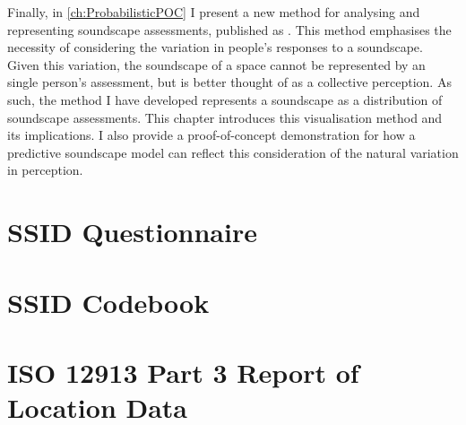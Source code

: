 \documentclass[twoside,fontsize=12pt,titlepage,chapterprefix=true
]{scrbook}
\begin{document}
Finally, in \cref{ch:ProbabilisticPOC} I present a new method for analysing and representing soundscape assessments, published as \citet{Mitchell2022How}. This method emphasises the necessity of considering the variation in people's responses to a soundscape. Given this variation, the soundscape of a space cannot be represented by an single person's assessment, but is better thought of as a collective perception. As such, the method I have developed represents a soundscape as a distribution of soundscape assessments. This chapter introduces this visualisation method and its implications. I also provide a proof-of-concept demonstration for how a predictive soundscape model can reflect this consideration of the natural variation in perception.  











\printglossaries



 \appendix


 \chapter{SSID Questionnaire}\label{app:questionnaire}
 

\chapter{SSID Codebook}\label{app:codebook}


 \chapter{ISO 12913 Part 3 Report of Location Data}\label{app:location-data}
      

 

 


\backmatter



\end{document}
